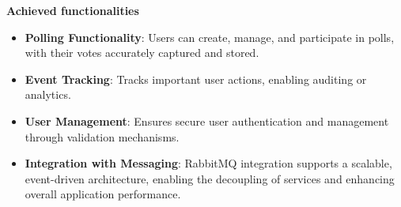 \vspace{0.5cm}
\textbf{Achieved functionalities}
\begin{itemize}
    \item \textbf{Polling Functionality}: Users can create, manage, and participate in polls, with their votes accurately captured and stored.
    \item \textbf{Event Tracking}: Tracks important user actions, enabling auditing or analytics.
    \item \textbf{User Management}: Ensures secure user authentication and management through validation mechanisms.
    \item \textbf{Integration with Messaging}: RabbitMQ integration supports a scalable, event-driven architecture, enabling the decoupling of services and enhancing overall application performance.
\end{itemize}